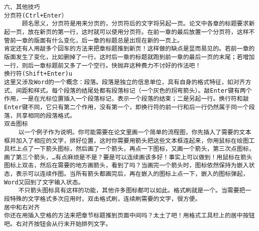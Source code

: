 \begin{verbatim}
六、其他技巧 
分页符(Ctrl+Enter） 
     顾名思义，分页符是用来分页的，分页符后的文字将另起一页。论文中各章的标题要求新起一页，放在新页的第一行，这时就可以使用分页符。在前一章的最后放置一个分页符，这样不管前一章的版面有什么变化，后一章的标题总是出现在新的一页上。 
肯定还有人用敲多个回车的方法来把章标题推到新页！这样做的缺点是显而易见的。若前一章的版面发生了变化，比如删掉了一行，这时后一章的标题就跑到前一章的最后一页的末尾；若增加一行，则后一章标题前又多了一个空行。快抛弃这种费力不讨好的作法吧！
换行符(Shift+Enter)u 
这里又涉及Word的一个概念：段落。段落是独立的信息单位，具有自身的格式特征，如对齐方式、间距和样式。每个段落的结尾处都有段落标记（一个灰色的拐弯箭头）。敲Enter键有两个作用，一是在光标位置插入一个段落标记，表示一个段落的结束；二是另起一行。换行符和敲Enter键不同，它只有第二个作用，没有第一个，即换行符的前一行和后一行仍然属于同一个段落，共享相同的段落格式。 
双击图标 
    以一个例子作为说明。你可能需要在论文里画一个简单的流程图，你先插入了需要的文本框并加入了相应的文字，排好位置，这时你需要用箭头把这些文本框连起来，你用鼠标在绘图工具栏上点了一下箭头图标，然后画了一个箭头，再点一下图标，又画一个箭头，第三次点图标，画了第三个箭头，…有点麻烦是不是？要是可以连续画该多好！事实上可以做到！用鼠标在箭头图标上双击，然后在需要的地方画箭头，看到了吗？当画完一个箭头时，图标依然保持为嵌入状态，表示可以连续作图。当所有箭头都画完后，再在嵌入的图标上点一下，嵌入的图标弹起，Word又回到了文字输入状态。 
    不只箭头图标具有这样的功能，其他许多图标都可以如此。格式刷就是一个。当需要把一段特殊的文字格式多次应用时，双击格式刷，连续刷需要的文字，很方便。 
居中和右对齐 
你还在用插入空格的方法来把章节标题推到页面中间吗？太土了吧！用格式工具栏上的居中按钮吧。右对齐按钮会从行末开始排列文字。
\end{verbatim}
